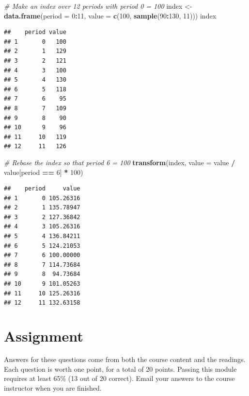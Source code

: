 \documentclass[]{article}
\newenvironment{Shaded}{\begin{snugshade}}{\end{snugshade}}
\newcommand{\CommentTok}[1]{\textcolor[rgb]{0.56,0.35,0.01}{\textit{#1}}}
\newcommand{\DataTypeTok}[1]{\textcolor[rgb]{0.13,0.29,0.53}{#1}}
\newcommand{\DecValTok}[1]{\textcolor[rgb]{0.00,0.00,0.81}{#1}}
\newcommand{\KeywordTok}[1]{\textcolor[rgb]{0.13,0.29,0.53}{\textbf{#1}}}
\newcommand{\NormalTok}[1]{#1}
\newcommand{\OperatorTok}[1]{\textcolor[rgb]{0.81,0.36,0.00}{\textbf{#1}}}
\newcommand{\StringTok}[1]{\textcolor[rgb]{0.31,0.60,0.02}{#1}}
\begin{document}
\begin{Shaded}
\begin{Highlighting}[]
\CommentTok{# Make an index over 12 periods with period 0 = 100}
\NormalTok{index <-}\StringTok{ }\KeywordTok{data.frame}\NormalTok{(}\DataTypeTok{period =} \DecValTok{0}\OperatorTok{:}\DecValTok{11}\NormalTok{, }\DataTypeTok{value =} \KeywordTok{c}\NormalTok{(}\DecValTok{100}\NormalTok{, }\KeywordTok{sample}\NormalTok{(}\DecValTok{90}\OperatorTok{:}\DecValTok{130}\NormalTok{, }\DecValTok{11}\NormalTok{)))}
\NormalTok{index}
\end{Highlighting}
\end{Shaded}

\begin{verbatim}
##    period value
## 1       0   100
## 2       1   129
## 3       2   121
## 4       3   100
## 5       4   130
## 6       5   118
## 7       6    95
## 8       7   109
## 9       8    90
## 10      9    96
## 11     10   119
## 12     11   126
\end{verbatim}

\begin{Shaded}
\begin{Highlighting}[]
\CommentTok{# Rebase the index so that period 6 = 100}
\KeywordTok{transform}\NormalTok{(index, }\DataTypeTok{value =}\NormalTok{ value }\OperatorTok{/}\StringTok{ }\NormalTok{value[period }\OperatorTok{==}\StringTok{ }\DecValTok{6}\NormalTok{] }\OperatorTok{*}\StringTok{ }\DecValTok{100}\NormalTok{)}
\end{Highlighting}
\end{Shaded}

\begin{verbatim}
##    period     value
## 1       0 105.26316
## 2       1 135.78947
## 3       2 127.36842
## 4       3 105.26316
## 5       4 136.84211
## 6       5 124.21053
## 7       6 100.00000
## 8       7 114.73684
## 9       8  94.73684
## 10      9 101.05263
## 11     10 125.26316
## 12     11 132.63158
\end{verbatim}

\hypertarget{assignment}{%
\section{Assignment}\label{assignment}}

Answers for these questions come from both the course content and the readings. Each question is worth one point, for a total of 20 points. Passing this module requires at least 65\% (13 out of 20 correct). Email your answers to the course instructor when you are finished.
\end{document}
